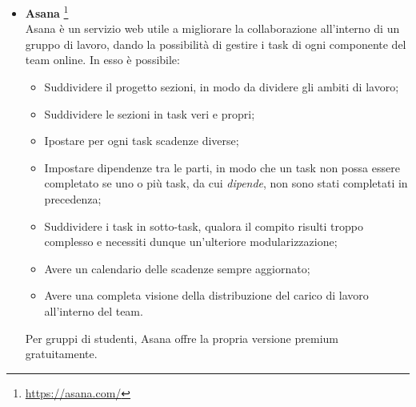 \begin{itemize}
\item \textbf{Asana} \footnote{\href{https://asana.com/}{https://asana.com/}}
	~\\Asana è un servizio web utile a migliorare la collaborazione all'interno di un gruppo di lavoro, dando la possibilità di gestire i task di ogni componente del team online. 
In esso è possibile:
\begin{itemize}
\item Suddividere il progetto sezioni, in modo da dividere gli ambiti di lavoro;
\item Suddividere le sezioni in task veri e propri;
\item Ipostare per ogni task scadenze diverse; 
\item Impostare dipendenze tra le parti, in modo che un task non possa essere completato se uno o più task, da cui \emph{dipende}, non sono stati completati in precedenza;
\item Suddividere i task in sotto-task, qualora il compito risulti troppo complesso e necessiti dunque un'ulteriore modularizzazione;
\item Avere un calendario delle scadenze sempre aggiornato;
\item Avere una completa visione della distribuzione del carico di lavoro all'interno del team.
\end{itemize}
Per gruppi di studenti, Asana offre la propria versione premium gratuitamente.
\end{itemize}


	